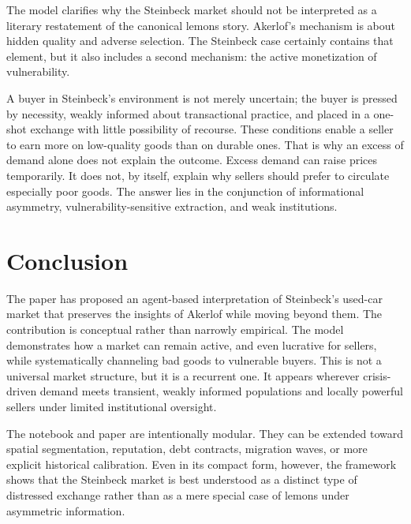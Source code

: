 \documentclass[12pt]{article}
\begin{document}
The model clarifies why the Steinbeck market should not be interpreted as a literary restatement of the canonical lemons story. Akerlof's mechanism is about hidden quality and adverse selection. The Steinbeck case certainly contains that element, but it also includes a second mechanism: the active monetization of vulnerability.

A buyer in Steinbeck's environment is not merely uncertain; the buyer is pressed by necessity, weakly informed about transactional practice, and placed in a one-shot exchange with little possibility of recourse. These conditions enable a seller to earn more on low-quality goods than on durable ones. That is why an excess of demand alone does not explain the outcome. Excess demand can raise prices temporarily. It does not, by itself, explain why sellers should prefer to circulate especially poor goods. The answer lies in the conjunction of informational asymmetry, vulnerability-sensitive extraction, and weak institutions.

\section{Conclusion}

The paper has proposed an agent-based interpretation of Steinbeck's used-car market that preserves the insights of Akerlof while moving beyond them. The contribution is conceptual rather than narrowly empirical. The model demonstrates how a market can remain active, and even lucrative for sellers, while systematically channeling bad goods to vulnerable buyers. This is not a universal market structure, but it is a recurrent one. It appears wherever crisis-driven demand meets transient, weakly informed populations and locally powerful sellers under limited institutional oversight.

The notebook and paper are intentionally modular. They can be extended toward spatial segmentation, reputation, debt contracts, migration waves, or more explicit historical calibration. Even in its compact form, however, the framework shows that the Steinbeck market is best understood as a distinct type of distressed exchange rather than as a mere special case of lemons under asymmetric information.


\end{document}

